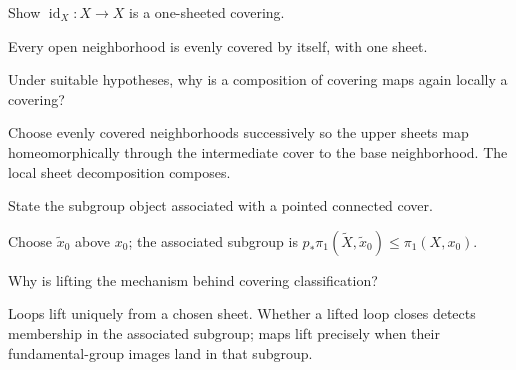 \begin{problem}\label{prob:viii10-21}
Show \(\operatorname{id}_X:X\to X\) is a one-sheeted covering.
\end{problem}
\begin{solution}
Every open neighborhood is evenly covered by itself, with one sheet.
\end{solution}

\begin{problem}\label{prob:viii10-22}
Under suitable hypotheses, why is a composition of covering maps again locally a covering?
\end{problem}
\begin{solution}
Choose evenly covered neighborhoods successively so the upper sheets map homeomorphically through the intermediate cover to the base neighborhood.  The local sheet decomposition composes.
\end{solution}

\begin{problem}\label{prob:viii10-23}
State the subgroup object associated with a pointed connected cover.
\end{problem}
\begin{solution}
Choose \(\tilde x_0\) above \(x_0\); the associated subgroup is \(p_*\pi_1(\widetilde X,\tilde x_0)\le\pi_1(X,x_0)\).
\end{solution}

\begin{problem}\label{prob:viii10-24}
Why is lifting the mechanism behind covering classification?
\end{problem}
\begin{solution}
Loops lift uniquely from a chosen sheet.  Whether a lifted loop closes detects membership in the associated subgroup; maps lift precisely when their fundamental-group images land in that subgroup.
\end{solution}
